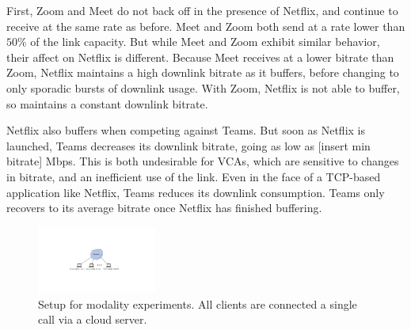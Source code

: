 First, Zoom and Meet do not back off in the presence of Netflix, and continue to receive at the same rate as before. Meet and Zoom both send at a rate lower than $50\%$ of the link capacity. But while Meet and Zoom exhibit similar behavior, their affect on Netflix is different. Because Meet receives at a lower bitrate than Zoom, Netflix maintains a high downlink bitrate as it buffers, before changing to only sporadic bursts of downlink usage. With Zoom, Netflix is not able to buffer, so maintains a constant downlink bitrate. 

Netflix also buffers when competing against Teams. But soon as Netflix is launched, Teams decreases its downlink bitrate, going as low as [insert min bitrate] Mbps. This is both undesirable for VCAs, which are sensitive to changes in bitrate, and an inefficient use of the link. Even in the face of a TCP-based application like Netflix, Teams reduces its downlink consumption. Teams only recovers to its average bitrate once Netflix has finished buffering. 


\begin{figure}[h]
\centering
    \includegraphics[width=0.35\textwidth,keepaspectratio]{../figures/methodology/modality-setup.pdf}
    \caption{Setup for modality experiments. All clients are connected a single call via a cloud server.}
    \label{fig:modality-setup}
\end{figure}





